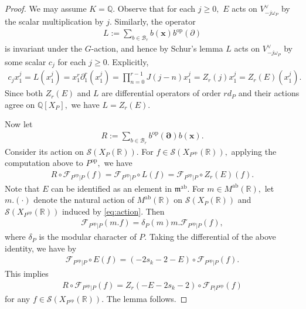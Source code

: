 \documentclass[11pt,a4paper,usenames,dvipsnames,reqno]{amsart}
\numberwithin{equation}{section}
\newcommand{\qq}{\mathbb Q}
\newcommand{\rr}{\mathbb R}
\theoremstyle{definition}
\theoremstyle{remark}
\begin{document}
\begin{proof}
We may assume $K=\qq$. Observe that for each $j\ge 0,$ $E$ acts on $V_{-j\omega_P}^\lor$ by the scalar multiplication by $j$. Similarly, the operator
\begin{align*}
    L:=\sum_{b\in \mathcal{B}_r} b(\mathbf{x})b^{\mathrm{op}}(\partial)
\end{align*}
is invariant under the $G$-action, and hence by Schur's lemma $L$ acts on $V_{-j\omega_P}^\lor$ by some scalar $c_j$ for each $j\ge 0$. Explicitly,
\begin{align*}
c_jx_1^j=L(x_1^j)=x_1^r\partial_1^r(x_1^j)=\prod_{n=0}^{r-1} J(j-n)x_1^j=Z_r(j)x_1^j=Z_r(E)(x_1^j).
\end{align*}
Since both $Z_r(E)$ and $L$ are differential operators of order $rd_P$ and their actions agree on $\qq[X_P],$ we have $L=Z_r(E)$.

Now let 
\begin{align*}
R:= \sum_{b\in \mathcal{B}_r} b^{\mathrm{op}}(\mathbf{\partial}) b(\mathbf{x}).
\end{align*}
Consider its action on $\mathcal{S}(X_{P}(\rr))$. For $f\in\mathcal{S}(X_{P^{\mathrm{op}}}(\rr)),$ applying  the computation above to $P^{\mathrm{op}},$ we have
\begin{align*}
    R\circ \mathcal{F}_{P^{\mathrm{op}}|P}(f)=\mathcal{F}_{P^{\mathrm{op}}|P}\circ L(f)=\mathcal{F}_{P^{\mathrm{op}}|P}\circ Z_r(E)(f).
\end{align*}
Note that $E$ can be identified as an element in $\mathfrak{m}^{\mathrm{ab}}.$ For $m\in M^{\mathrm{ab}}(\rr),$ let $m.(\cdot)$ denote the natural action of $M^{\mathrm{ab}}(\rr)$ on $\mathcal{S}(X_{P}(\rr))$ and $\mathcal{S}(X_{P^{\mathrm{op}}}(\rr))$ induced by \eqref{eq:action}. Then  
\begin{align*}
    \mathcal{F}_{P^{\mathrm{op}}|P}(m.f)=\delta_P(m)m.\mathcal{F}_{P^{\mathrm{op}}|P}(f),
\end{align*}
where $\delta_P$ is the modular character of $P$. Taking the differential of the above identity, we have by \cite[Proposition 6.2]{Getz:Hsu:Leslie}
\begin{align*}
    \mathcal{F}_{P^{\mathrm{op}}|P}\circ E(f)=(-2s_k-2-E)\circ \mathcal{F}_{P^{\mathrm{op}}|P}(f).
\end{align*}
This implies 
\begin{align*}
     R\circ \mathcal{F}_{P^{\mathrm{op}}|P}(f)=Z_r(-E-2s_k-2)\circ \mathcal{F}_{P|P^{\mathrm{op}}}(f)
\end{align*}
for any $f\in\mathcal{S}(X_{P^{\mathrm{op}}}(\rr)).$ The lemma follows.
\end{proof}
\end{document}

